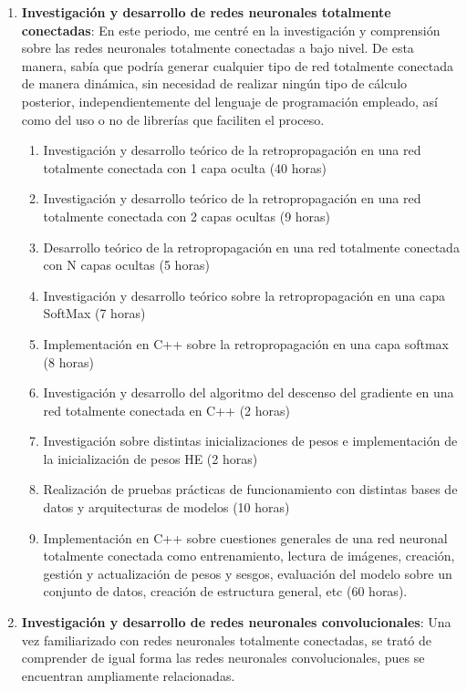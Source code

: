 \begin{enumerate}[label=\textbullet]
	\item \textbf{Investigación y desarrollo de redes neuronales totalmente conectadas}: En este periodo, me centré en la investigación y comprensión sobre las redes neuronales totalmente conectadas a bajo nivel. De esta manera, sabía que podría generar cualquier tipo de red totalmente conectada de manera dinámica, sin necesidad de realizar ningún tipo de cálculo posterior, independientemente del lenguaje de programación empleado, así como del uso o no de librerías que faciliten el proceso. 
	\begin{enumerate}[label=\textbullet]
		\item Investigación y desarrollo teórico de la retropropagación en una red totalmente conectada con 1 capa oculta (40 horas)
		\item Investigación y desarrollo teórico de la retropropagación en una red totalmente conectada con 2 capas ocultas (9 horas)
		\item Desarrollo teórico de la retropropagación en una red totalmente conectada con N capas ocultas (5 horas)
		\item Investigación y desarrollo teórico sobre la retropropagación en una capa SoftMax (7 horas)
		\item Implementación en C++ sobre la retropropagación en una capa softmax (8 horas)
		\item Investigación y desarrollo del algoritmo del descenso del gradiente en una red totalmente conectada en C++ (2 horas)
		\item Investigación sobre distintas inicializaciones de pesos e implementación de la inicialización de pesos HE (2 horas)	
		\item Realización de pruebas prácticas de funcionamiento con distintas bases de datos y arquitecturas de modelos (10 horas)	
		\item Implementación en C++ sobre cuestiones generales de una red neuronal totalmente conectada como entrenamiento, lectura de imágenes, creación, gestión y actualización de pesos y sesgos, evaluación del modelo sobre un conjunto de datos, creación de estructura general, etc (60 horas).
	\end{enumerate}
	\item \textbf{Investigación y desarrollo de redes neuronales convolucionales}:
	Una vez familiarizado con redes neuronales totalmente conectadas, se trató de comprender de igual forma las redes neuronales convolucionales, pues se encuentran ampliamente relacionadas.
	\begin{enumerate}[label=\textbullet]

\end{enumerate}
\end{enumerate}
